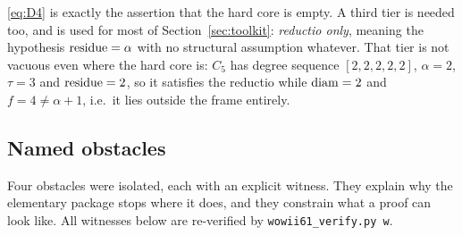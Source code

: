 \eqref{eq:D4} is exactly the assertion that the hard core is empty. A third tier is needed
too, and is used for most of Section~\ref{sec:toolkit}: \emph{reductio only}, meaning the
hypothesis $\operatorname{residue} = \alpha$ with no structural assumption whatever. That tier is not vacuous
even where the hard core is: $C_5$ has degree sequence $[2,2,2,2,2]$, $\alpha = 2$,
$\tau = 3$ and $\operatorname{residue} = 2$, so it satisfies the reductio while $\operatorname{diam} = 2$ and
$f = 4 \ne \alpha+1$, i.e.\ it lies outside the frame entirely.

\subsection{Named obstacles}\label{sec:obstacles}

Four obstacles were isolated, each with an explicit witness. They explain why the
elementary package stops where it does, and they constrain what a proof can look like. All
witnesses below are re-verified by \texttt{wowii61\_verify.py w}.

